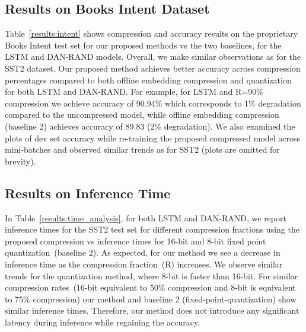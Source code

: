 \vspace{-1mm}
\subsection{Results on Books Intent Dataset}
Table~\ref{results:intent} shows compression and accuracy results on the
proprietary Books Intent test set for our proposed methods vs the two baselines,
for the LSTM and DAN-RAND models. Overall, we make similar observations as for
the SST2 dataset. Our proposed method achieves better accuracy across
compression percentages compared to both offline embedding compression and
quantization for both LSTM and DAN-RAND. For example, for LSTM and R=90\% compression we
achieve accuracy of 90.94\% which corresponds to 1\% degradation compared to the
uncompressed model, while offline embedding compression (baseline 2) achieves
accuracy of 89.83 (2\% degradation). We also examined the plots of dev set
accuracy while re-training the proposed compressed model across mini-batches and
observed similar trends as for SST2 (plots are omitted for brevity).

\vspace{-1mm}
\subsection{Results on Inference Time}
In Table~\ref{results:time_analysis}, for both LSTM and DAN-RAND, we report inference times for the SST2 test set for different compression fractions using the proposed compression vs inference times for 16-bit and 8-bit fixed point quantization~(baseline 2). As expected, for our method we see a decrease in inference time as the compression fraction~(R) increases. We observe similar trends for the quantization method, where 8-bit is faster
than 16-bit. For similar compression rates~(16-bit equivalent to 50\%
compression and 8-bit is equivalent to 75\% compression) our method and baseline 2 (fixed-point-quantization) show similar inference times. Therefore, our method does not introduce any significant latency during inference while regaining the accuracy. 
\begin{table}[]
  \centering
	\caption{\small Inference Time on the SST2 test set (seconds)}
	\label{results:time_analysis}
\end{table}

